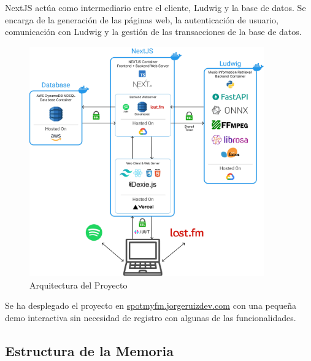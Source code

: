 NextJS actúa como intermediario entre el cliente, Ludwig y la base de datos. Se encarga de la generación de las páginas web, la autenticación de usuario, comunicación con Ludwig y la gestión de las transacciones de la base de datos. 
\begin{figure}
    \centering
    \includegraphics[width=0.9\textwidth,keepaspectratio]{img/arch_full.jpg}
    \caption{Arquitectura del Proyecto}
    \label{fig:arquitectura_contenedores}
\end{figure}

Se ha desplegado el proyecto en \href{https://spotmyfm.jorgeruizdev.com}{spotmyfm.jorgeruizdev.com} con una pequeña demo interactiva sin necesidad de registro con algunas de las funcionalidades. 

\subsection{Estructura de la Memoria}


